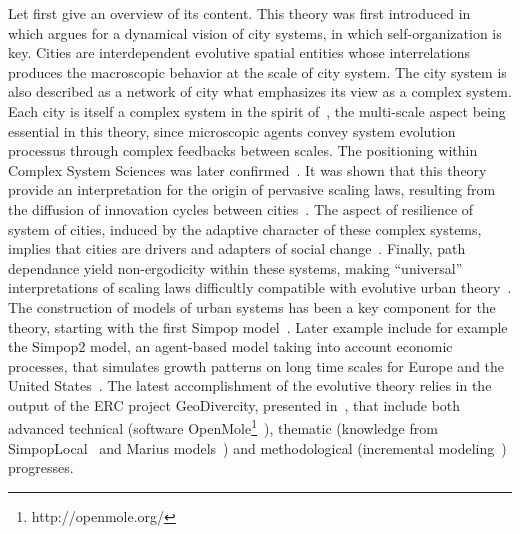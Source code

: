 \documentclass[runningheads,a4paper]{llncs2e/llncs}
\begin{document}
Let first give an overview of its content. This theory was first introduced in~\cite{pumain1997pour} which argues for a dynamical vision of city systems, in which self-organization is key. Cities are interdependent evolutive spatial entities whose interrelations produces the macroscopic behavior at the scale of city system. The city system is also described as a network of city what emphasizes its view as a complex system. Each city is itself a complex system in the spirit of~\cite{berry1964cities}, the multi-scale aspect being essential in this theory, since microscopic agents convey system evolution processus through complex feedbacks between scales. The positioning within Complex System Sciences was later confirmed~\cite{pumain2003approche}. It was shown that this theory provide an interpretation for the origin of pervasive scaling laws, resulting from the diffusion of innovation cycles between cities~\cite{pumain2006evolutionary}. The aspect of resilience of system of cities, induced by the adaptive character of these complex systems, implies that cities are drivers and adapters of social change~\cite{pumain2010theorie}. Finally, path dependance yield non-ergodicity within these systems, making ``universal'' interpretations of scaling laws difficultly compatible with evolutive urban theory~\cite{pumain2012urban}. The construction of models of urban systems has been a key component for the theory, starting with the first Simpop model~\cite{sanders1997simpop}. Later example include for example the Simpop2 model, an agent-based model taking into account economic processes, that simulates growth patterns on long time scales for Europe and the United States~\cite{doi:10.1177/0042098010377366}. The latest accomplishment of the evolutive theory relies in the output of the ERC project GeoDivercity, presented in~\cite{pumain2017urban}, that include both advanced technical (software OpenMole\footnote{http://openmole.org/}~\cite{reuillon2013openmole}), thematic (knowledge from SimpopLocal~\cite{schmitt2014modelisation} and Marius models~\cite{cottineau2014evolution}) and methodological (incremental modeling~\cite{cottineau2015incremental}) progresses.
\end{document}
